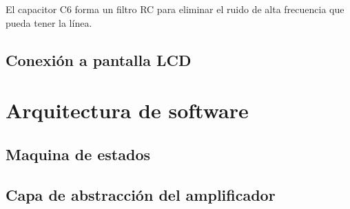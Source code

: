 El capacitor C6 forma un filtro RC para eliminar el ruido de alta frecuencia que pueda tener la línea.

\subsection{Conexión a pantalla LCD}

\section{Arquitectura de software}

\subsection{Maquina de estados}

\subsection{Capa de abstracción del amplificador}


